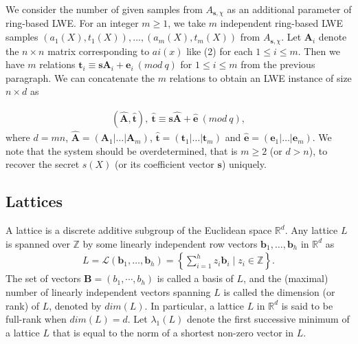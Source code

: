 \documentclass[12pt,a4paper]{article}
\numberwithin{equation}{section}
\begin{document}
We consider the number of given samples from $A_{\mathbf{s},\chi}$ as an additional parameter of ring-based LWE. For an integer $m \geq 1$, we take $m$ independent ring-based LWE samples $(a_1(X), t_1(X)) ,\ldots, (a_m(X), t_m(X))$ from $A_{\mathbf{s},\chi}$. Let $\mathbf{A}_i$ denote the $n \times n$ matrix corresponding to $ai(x)$ like (2) for each $1 \leq i \leq m$. Then we have $m$ relations $\mathbf{t}_i \equiv \mathbf{s}\mathbf{A}_i + \mathbf{e}_i \ (mod \ q)$ for $1 \leq i \leq m$ from the previous paragraph. We can concatenate the $m$ relations to obtain an LWE instance of size $n \times d$ as

\begin{align*}
    (\mathbf{\hat{A}},\mathbf{\hat{t}}), \  \mathbf{\hat{t}} \equiv \mathbf{s}\mathbf{\hat{A}} + \mathbf{\hat{e}} \ (mod \ q),
\end{align*}
where $d = mn$, $\mathbf{\hat{A}} = (\mathbf{A}_1 | \ldots | \mathbf{A}_m)$, $\mathbf{\hat{t}} = (\mathbf{t}_1 | \ldots | \mathbf{t}_m)$ and $\mathbf{\hat{e}} = (\mathbf{e}_1 | \ldots | \mathbf{e}_m)$.
We note that the system should be overdetermined, that is $m \geq 2$ (or $d > n$), to recover the secret $s(X)$ (or its coefficient vector $\mathbf{s}$) uniquely.

\subsection{Lattices}
A lattice is a discrete additive subgroup of the Euclidean space $\mathbb{R}^d$.
Any lattice $L$ is spanned over $\mathbb{Z}$ by some linearly independent row vectors $\mathbf{b}_1,\ldots, \mathbf{b}_h$ in $\mathbb{R}^d$ as 
\begin{align*}
    L = \mathcal{L}(\mathbf{b}_1,\ldots, \mathbf{b}_h) = \left\{ \sum_{i=1}^h z_i \mathbf{b}_i \mid z_i \in \mathbb{Z} \right\}.
\end{align*}
The set of vectors $\mathbf{B}=(b_1,\cdots, b_h)$ is called a basis of $L$, and the (maximal) number of linearly independent vectors spanning $L$ is called the dimension (or rank) of $L$, denoted by $dim(L)$.
In particular, a lattice $L$ in $\mathbb{R}^d$ is said to be full-rank when $dim(L) = d$.
Let $\lambda_1(L)$ denote the first successive minimum of a lattice $L$ that is equal to the norm of a shortest non-zero vector in $L$.
\end{document}
